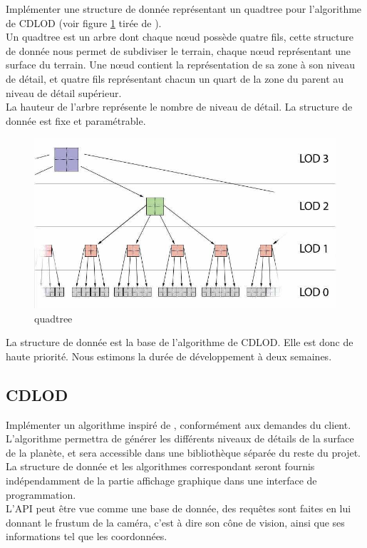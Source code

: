\documentclass[12pt]{report}
\begin{document}
Implémenter une structure de donnée représentant un quadtree pour
l'algorithme de CDLOD (voir figure \ref{fig:quadtree} tirée de 
\cite{CDLOD}).\\
Un quadtree est un arbre dont chaque nœud possède quatre fils, cette
structure de donnée nous permet de subdiviser le terrain, chaque nœud
représentant une surface du terrain. Une nœud contient la représentation
de sa zone à son niveau de détail, et quatre fils représentant chacun un
quart de la zone du parent au niveau de détail supérieur.\\
La hauteur de l'arbre représente le nombre de niveau de détail.
La structure de donnée est fixe et paramétrable.
\begin{center}
\begin{figure}[!h]
  \includegraphics[scale=0.5]{img/Quadtree.png}
  \caption{quadtree \cite{CDLOD}}
  \label{fig:quadtree}
\end{figure}
\end{center}

La structure de donnée est la base de l'algorithme de CDLOD. Elle est
donc de haute priorité. Nous estimons la durée de développement à deux
semaines.\\

\subsection{CDLOD}

Implémenter un algorithme inspiré de \cite{CDLOD}, conformément aux
demandes du client.  L'algorithme permettra de générer les différents
niveaux de détails de la surface de la planète, et sera accessible dans
une bibliothèque séparée du reste du projet. La structure de donnée et
les algorithmes correspondant seront fournis indépendamment de la partie
affichage graphique dans une interface de programmation.\\
L'API peut être vue comme une base de donnée, des requêtes sont faites
en lui donnant le frustum de la caméra, c'est à dire son cône de vision,
ainsi que ses informations tel que les coordonnées.
\end{document}
